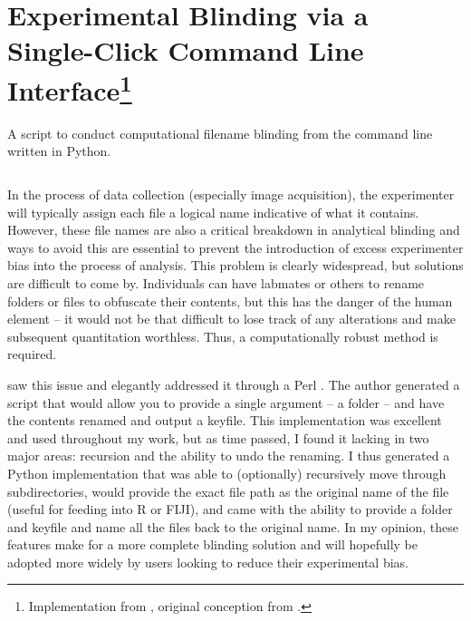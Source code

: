 \section[Experimental Blinding via a Single-Click Command Line Interface]{Experimental Blinding via a Single-Click Command Line Interface\footnote{Implementation from \citet{Brewer2022}, original conception from \citet{Salter2016}.}}\label{blinders}

\begin{code}
\caption{A script to conduct computational filename blinding from the command line written in Python.}
\label{blinder}

\inputminted[breaklines,frame=single,fontsize=\small]{python}{source/renamer.py}

\end{code}

In the process of data collection (especially image acquisition), the experimenter will typically assign each file a logical name indicative of what it contains. However, these file names are also a critical breakdown in analytical blinding and ways to avoid this are essential to prevent the introduction of excess experimenter bias into the process of analysis. This problem is clearly widespread, but solutions are difficult to come by. Individuals can have labmates or others to rename folders or files to obfuscate their contents, but this has the danger of the human element -- it would not be that difficult to lose track of any alterations and make subsequent quantitation worthless. Thus, a computationally robust method is required. 

\citet{Salter2016} saw this issue and elegantly addressed it through a Perl \citep{Wall2000}. The author generated a script that would allow you to provide a single argument -- a folder -- and have the contents renamed and output a keyfile. This implementation was excellent and used throughout my work, but as time passed, I found it lacking in two major areas: recursion and the ability to undo the renaming. I thus generated a Python implementation that was able to (optionally) recursively move through subdirectories, would provide the exact file path as the original name of the file (useful for feeding into R or FIJI), and came with the ability to provide a folder and keyfile and name all the files back to the original name. In my opinion, these features make for a more complete blinding solution and will hopefully be adopted more widely by users looking to reduce their experimental bias.

